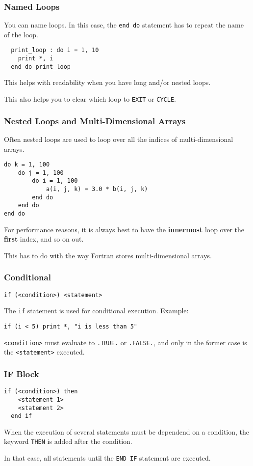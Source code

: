 \begin{frame}[fragile]
  \frametitle{Named Loops}

  You can name loops.
  In this case, the \texttt{end do} statement has to repeat the name of the loop.

  \begin{lstlisting}
  print_loop : do i = 1, 10
    print *, i
  end do print_loop
  \end{lstlisting}

  This helps with readability when you have long and/or nested loops.

  This also helps you to clear which loop to \texttt{EXIT} or \texttt{CYCLE}.

\end{frame}

\begin{frame}[fragile]
  \frametitle{Nested Loops and Multi-Dimensional Arrays}

  Often nested loops are used to loop over all the indices of multi-dimensional arrays.

  \begin{lstlisting}
do k = 1, 100
    do j = 1, 100
        do i = 1, 100
            a(i, j, k) = 3.0 * b(i, j, k)
        end do
    end do
end do
  \end{lstlisting}

  For performance reasons, it is always best to have the \textbf{innermost} loop over the \textbf{first} index, and so on out.

  This has to do with the way Fortran stores multi-dimensional arrays.
\end{frame}


\begin{frame}[fragile]
  \frametitle{Conditional}

  \begin{lstlisting}[numbers=none]
  if (<condition>) <statement>
  \end{lstlisting}
  The \texttt{if} statement is used for conditional execution.
  Example:
  \begin{lstlisting}[numbers=none]
  if (i < 5) print *, "i is less than 5"
  \end{lstlisting}

  \texttt{<condition>} must evaluate to \texttt{.TRUE.} or \texttt{.FALSE.}, and only in the former case is the \texttt{<statement>} executed.

\end{frame}

\begin{frame}[fragile]
  \frametitle{IF Block}

  \begin{lstlisting}[numbers=none]
  if (<condition>) then
    <statement 1>
    <statement 2>
  end if
  \end{lstlisting}

  When the execution of several statements must be dependend on
  a condition, the keyword \texttt{THEN} is added after the condition.

  In that case, all statements until the \texttt{END IF} statement are
  executed.

\end{frame}

